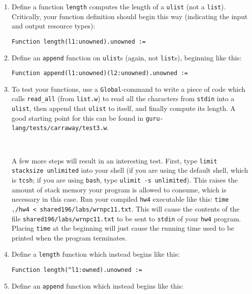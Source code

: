\documentclass{book}[12pt]
\begin{document}
\begin{enumerate}
\item Define a function \texttt{length} computes the length of a \texttt{ulist} (not a \texttt{list}).
Critically, your function definition should begin this way (indicating the input and output resource types):

\begin{verbatim}
Function length(l1:unowned).unowned :=
\end{verbatim}

\item Define an \texttt{append} function on \texttt{ulist}s (again, not \texttt{list}s), beginning like this:

\begin{verbatim}
Function append(l1:unowned)(l2:unowned).unowned :=
\end{verbatim}

\item To test your functions, use a \texttt{Global}-command to write a
piece of code which calls \texttt{read\_all} (from \texttt{list.w}) to
read all the characters from \texttt{stdin} into a \texttt{ulist},
then append that \texttt{ulist} to itself, and finally compute its
length.  A good starting point for this can be found in
\texttt{guru-lang/tests/carraway/test3.w}.

\ 

A few more steps will result in an interesting test.  First, type
\texttt{limit stacksize unlimited} into your shell (if you are using
the default shell, which is \texttt{tcsh}; if you are using
\texttt{bash}, type \texttt{ulimit -s unlimited}).  This raises the
amount of stack memory your program is allowed to consume, which is
necessary in this case.  Run your compiled \texttt{hw4} executable like
this: \texttt{time ./hw4 < shared196/labs/wrnpc11.txt}.  This will cause the
contents of the file \texttt{shared196/labs/wrnpc11.txt} to be sent to
\texttt{stdin} of your \texttt{hw4} program.  Placing \texttt{time} at
the beginning will just cause the running time used to be printed when
the program terminates.

\item Define a \texttt{length} function which instead begins like this:

\begin{verbatim}
Function length(^l1:owned).unowned :=
\end{verbatim}

\item Define an \texttt{append} function which instead begins like this:


\end{enumerate}
\end{document}
